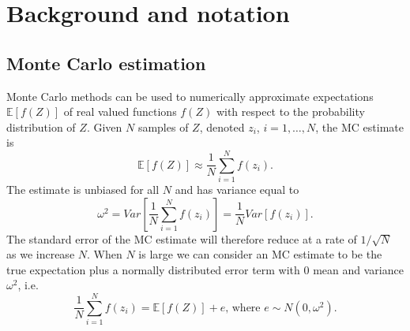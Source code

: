 \documentclass{article} %
\begin{document}

\section{Background and notation}\label{sec:background}


\subsection{Monte Carlo estimation}

Monte Carlo methods can be used to numerically approximate expectations $\mathbb{E}[f(Z)]$ of real valued functions $f(Z)$ with respect to the probability distribution of $Z$. Given $N$ samples of $Z$, denoted $z_{i}$, $i=1,\ldots,N$, the MC estimate is
\begin{equation}
\mathbb{E}[f(Z)] \approx \frac{1}{N} \sum_{i=1}^{N} f(z_{i}).
\end{equation}
The estimate is unbiased for all $N$ and has variance equal to
\begin{equation}
\omega^{2} = Var[\frac{1}{N} \sum_{i=1}^{N} f(z_{i})] = \frac{1}{N} Var[f(z_{i})].
\end{equation}
The standard error of the MC estimate will therefore reduce at a rate of $1/\sqrt{N}$ as we increase $N$. When $N$ is large we can consider an MC estimate to be the true expectation plus a normally distributed error term with 0 mean and variance $\omega^{2}$, i.e.
\begin{equation}\label{eqn:MC_error}
\frac{1}{N} \sum_{i=1}^{N} f(z_{i}) = \mathbb{E}[f(Z)] + e \text{, where } e \sim N(0, \omega^{2}).
\end{equation}
\end{document}

